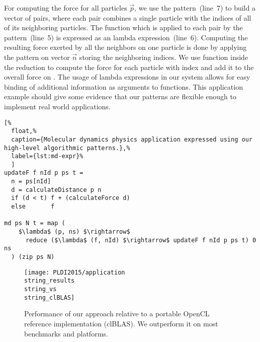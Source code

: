 %
%


For computing the force for all particles $\vec{p}$, we use the  pattern~(line~7) to build a vector of pairs, where each pair combines a single particle with the indices of all of its neighboring particles.
The function which is applied to each pair by the  pattern~(line~5) is expressed as an lambda expression~(line~6).
Computing the resulting force exerted by all the neighbors on one particle is done by applying the  pattern on vector $\vec{n}$ storing the neighboring indices.
We use function  inside the reduction to compute the force for each particle with index  and add it to the overall force on .
The usage of lambda expressions in our system allows for easy binding of additional information as arguments to functions.
This application example should give some evidence that our patterns are flexible enough to implement real world applications.


\begin{lstlisting}[%
  float,%
  caption={Molecular dynamics physics application expressed using our high-level algorithmic patterns.},%
  label={lst:md-expr}%
  ]
updateF f nId p ps t =
  n = ps[nId]
  d = calculateDistance p n
  if (d < t) f + (calculateForce d)
  else       f

md ps N t = map (
    $\lambda$ (p, ns) $\rightarrow$ 
      reduce ($\lambda$ (f, nId) $\rightarrow$ updateF f nId p ps t) 0 ns
  ) (zip ps N)
\end{lstlisting}

\begin{figure}[t]
  \texttt{[image: PLDI2015/application\\string\_results\\string\_vs\\string\_clBLAS]} 
  \caption{Performance of our approach relative to a portable OpenCL reference implementation (clBLAS).
           We outperform it on most benchmarks and platforms.}
  \label{fig:clblas}
\end{figure}



